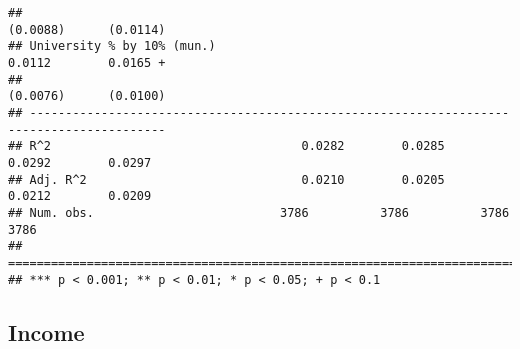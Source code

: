 \documentclass[
]{article}
\begin{document}
\begin{verbatim}
##                                                                  (0.0088)      (0.0114)  
## University % by 10% (mun.)                                        0.0112        0.0165 + 
##                                                                  (0.0076)      (0.0100)  
## -----------------------------------------------------------------------------------------
## R^2                                   0.0282        0.0285        0.0292        0.0297   
## Adj. R^2                              0.0210        0.0205        0.0212        0.0209   
## Num. obs.                          3786          3786          3786          3786        
## =========================================================================================
## *** p < 0.001; ** p < 0.01; * p < 0.05; + p < 0.1
\end{verbatim}

\hypertarget{income-4}{%
\subsection{Income}\label{income-4}}
\end{document}
